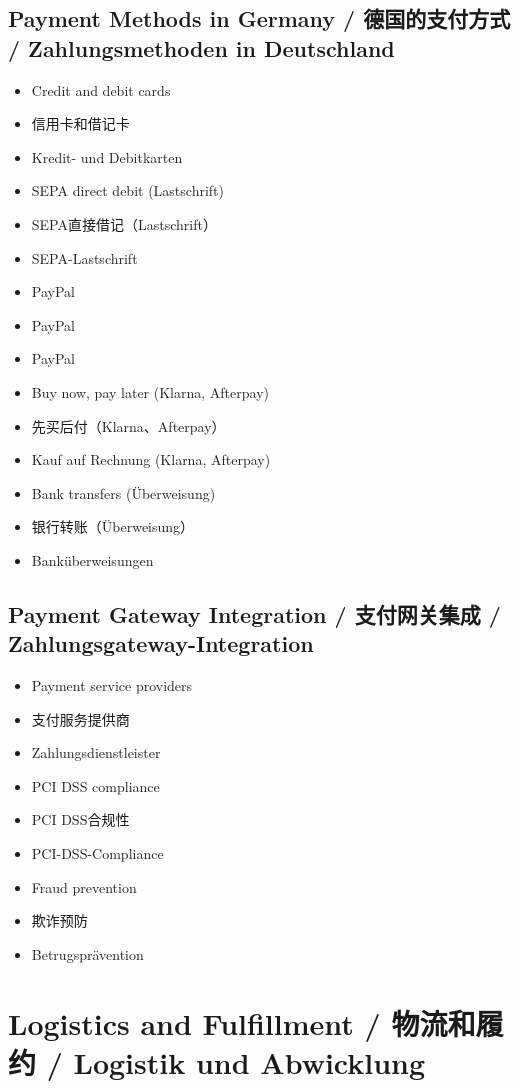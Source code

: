 \subsection{Payment Methods in Germany / 德国的支付方式 / Zahlungsmethoden in Deutschland}
\begin{itemize}
    \item Credit and debit cards
    \item 信用卡和借记卡
    \item Kredit- und Debitkarten
    \item SEPA direct debit (Lastschrift)
    \item SEPA直接借记（Lastschrift）
    \item SEPA-Lastschrift
    \item PayPal
    \item PayPal
    \item PayPal
    \item Buy now, pay later (Klarna, Afterpay)
    \item 先买后付（Klarna、Afterpay）
    \item Kauf auf Rechnung (Klarna, Afterpay)
    \item Bank transfers (Überweisung)
    \item 银行转账（Überweisung）
    \item Banküberweisungen
\end{itemize}

\subsection{Payment Gateway Integration / 支付网关集成 / Zahlungsgateway-Integration}
\begin{itemize}
    \item Payment service providers
    \item 支付服务提供商
    \item Zahlungsdienstleister
    \item PCI DSS compliance
    \item PCI DSS合规性
    \item PCI-DSS-Compliance
    \item Fraud prevention
    \item 欺诈预防
    \item Betrugsprävention
\end{itemize}

\section{Logistics and Fulfillment / 物流和履约 / Logistik und Abwicklung}

